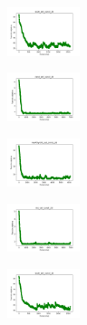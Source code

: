 \begin{figure}[H]
\begin{subfigure}
    \end{subfigure}
    \hfill
    \begin{subfigure}
        \centering
        \includegraphics[width=0.234\textwidth]{img/am01mej/ecoli_set_const_20_589741062_cost.png}
    \end{subfigure}
    \hfill
    \begin{subfigure}
        \centering
        \includegraphics[width=0.234\textwidth]{img/am01mej/rand_set_const_20_589741062_cost.png}
    \end{subfigure}
    \hfill
    \begin{subfigure}
        \centering
        \includegraphics[width=0.234\textwidth]{img/am01mej/newthyroid_set_const_20_589741062_cost.png}
    \end{subfigure}
    \hfill
    \begin{subfigure}
        \centering
        \includegraphics[width=0.234\textwidth]{img/am01mej/iris_set_const_20_277451237_cost.png}
    \end{subfigure}
    \hfill
    \begin{subfigure}
        \centering
        \includegraphics[width=0.234\textwidth]{img/am01mej/ecoli_set_const_20_277451237_cost.png}
    \end{subfigure}

\end{figure}
